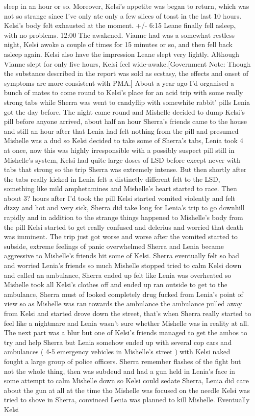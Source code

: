 \documentclass[12pt]{book}
\begin{document}
sleep in an hour or so. Moreover, Kelsi's appetite was began to return, which was not so strange since I've only ate only a few slices of toast in the last 10 hours. Kelsi's body felt exhausted at the moment. +/- 6:15 Leane finally fell asleep, with no problems. 12:00 The awakened. Vianne had was a somewhat restless night, Kelsi awoke a couple of times for 15 minutes or so, and then fell back asleep again. Kelsi also have the impression Leane slept very lightly. Although Vianne slept for only five hours, Kelsi feel wide-awake.[Government Note: Though the substance described in the report was sold as ecstasy, the effects and onset of symptoms are more consistent with PMA.] About a year ago I'd organised a bunch of mates to come round to Kelsi's place for an acid trip with some really strong tabs while Sherra was went to candyflip with somewhite rabbit' pills Lenia got the day before. The night came round and Mishelle decided to dump Kelsi's pill before anyone arrived, about half an hour Sherra's friends came to the house and still an hour after that Lenia had felt nothing from the pill and presumed Mishelle was a dud so Kelsi decided to take some of Sherra's tabs, Lenia took 4 at once, now this was highly irresponsible with a possibly suspect pill still in Mishelle's system, Kelsi had quite large doses of LSD before except never with tabs that strong so the trip Sherra was extremely intense. But then shortly after the tabs really kicked in Lenia felt a distinctly different felt to the LSD, something like mild amphetamines and Mishelle's heart started to race. Then about 3? hours after I'd took the pill Kelsi started vomited violently and felt dizzy and hot and very sick, Sherra did take long for Lenia's trip to go downhill rapidly and in addition to the strange things happened to Mishelle's body from the pill Kelsi started to get really confused and delerius and worried that death was imminent. The trip just got worse and worse after the vomited started to subside, extreme feelings of panic overwhelmed Sherra and Lenia became aggressive to Mishelle's friends hit some of Kelsi. Sherra eventually felt so bad and worried Lenia's friends so much Mishelle stopped tried to calm Kelsi down and called an ambulance, Sherra ended up felt like Lenia was overheated so Mishelle took all Kelsi's clothes off and ended up ran outside to get to the ambulance, Sherra must of looked completely drug fucked from Lenia's point of view so as Mishelle was ran towards the ambulance the ambulance pulled away from Kelsi and started drove down the street, that's when Sherra really started to feel like a nightmare and Lenia wasn't sure whether Mishelle was in reality at all. The next part was a blur but one of Kelsi's friends managed to get the ambos to try and help Sherra but Lenia somehow ended up with several cop cars and ambulances ( 4-5 emergency vehicles in Mishelle's street ) with Kelsi naked fought a large group of police officers. Sherra remember flashes of the fight but not the whole thing, then was subdeud and had a gun held in Lenia's face in some attempt to calm Mishelle down so Kelsi could sedate Sherra, Lenia did care about the gun at all at the time tho Mishelle was focused on the needle Kelsi was tried to shove in Sherra, convinced Lenia was planned to kill Mishelle. Eventually Kelsi 
\end{document}
